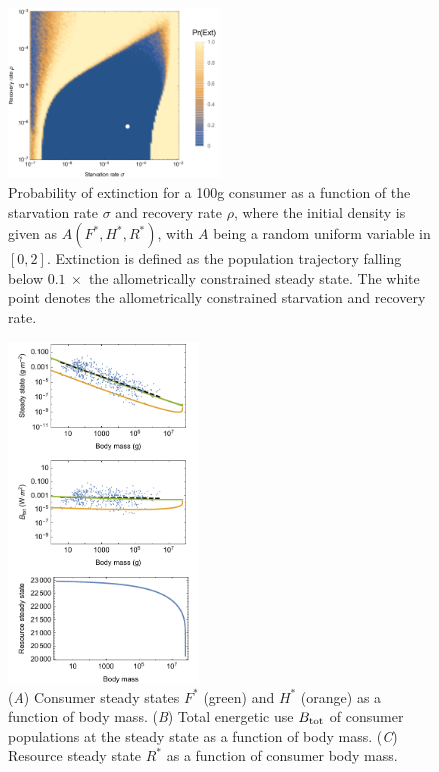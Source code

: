 \documentclass{pnastwo}
\begin{document}
\begin{figure}
\centering
\includegraphics[width=0.5\textwidth]{fig_ExtinctionAllometric2.png}
\caption{ Probability of extinction for a 100g consumer as a function of the starvation rate $\sigma$ and recovery rate $\rho$, where the initial density is given as $A(F^*,H^*,R^*)$, with
  $A$ being a random uniform variable in $[0,2]$.  Extinction is defined as the
  population trajectory falling below $0.1~\times$ the allometrically
  constrained steady state. The white point denotes the allometrically constrained starvation and recovery rate.}
\label{fig:ext}
\end{figure}

\begin{figure}
\centering
\includegraphics[width=0.45\textwidth]{fig_FPAllometric.pdf}
\caption{ (\emph{A}) Consumer steady states $F^*$ (green) and $H^*$ (orange) as a function of
  body mass.
  (\emph{B}) Total energetic use $B_{\rm tot}$ of consumer populations at the steady state as a function of body mass.
  (\emph{C}) Resource steady state $R^*$ as a function of consumer body mass.}
\label{fig:mass}
\end{figure}
\end{document}
